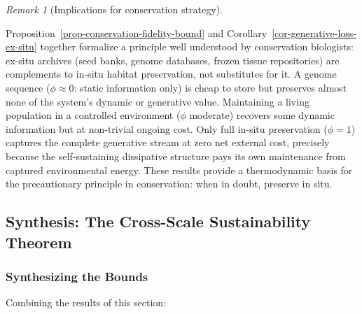 \documentclass[11pt]{article}
\theoremstyle{plain}
\theoremstyle{definition}
\theoremstyle{remark}
\newtheorem{remark}{Remark}
\newcounter{none}
\let\origsubsection\subsection
\renewcommand{\subsection}{\needspace{7\baselineskip}\origsubsection}
\let\origsubsubsection\subsubsection
\renewcommand{\subsubsection}{\needspace{4\baselineskip}\origsubsubsection}
\begin{document}
\begin{remark}[Implications for conservation strategy]
\label{rem-conservation-strategy}

Proposition~\ref{prop-conservation-fidelity-bound} and Corollary~\ref{cor-generative-loss-ex-situ} together formalize a principle well understood by conservation biologists: ex-situ archives (seed banks, genome databases, frozen tissue repositories) are complements to in-situ habitat preservation, not substitutes for it. A genome sequence ($\phi \approx 0$: static information only) is cheap to store but preserves almost none of the system's dynamic or generative value. Maintaining a living population in a controlled environment ($\phi$ moderate) recovers some dynamic information but at non-trivial ongoing cost. Only full in-situ preservation ($\phi = 1$) captures the complete generative stream at zero net external cost, precisely because the self-sustaining dissipative structure pays its own maintenance from captured environmental energy. These results provide a thermodynamic basis for the precautionary principle in conservation: when in doubt, preserve in situ.
\end{remark}

\subsection{Synthesis: The Cross-Scale Sustainability
Theorem}\label{synthesis-the-cross-scale-sustainability-theorem}

\subsubsection{Synthesizing the Bounds}\label{synthesizing-the-bounds}

Combining the results of this section:
\end{document}

